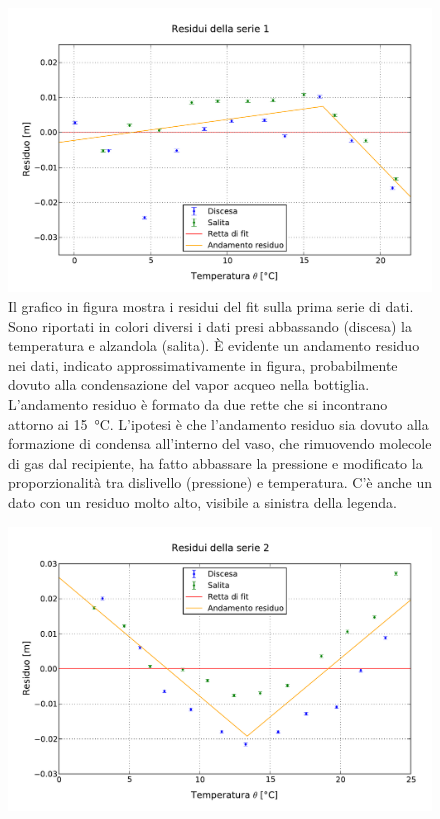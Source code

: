 \begin{figure}[p]
    \centering
    \includegraphics[width=130mm]{immagini/fit1.pdf}
    \caption{Il grafico in figura mostra i residui del fit sulla prima serie di dati. Sono riportati in colori
    diversi i dati presi abbassando (discesa) la temperatura e alzandola (salita). È evidente un andamento residuo nei dati,
    indicato approssimativamente in figura, probabilmente dovuto alla condensazione del vapor acqueo nella bottiglia. L'andamento
    residuo è formato da due rette che si incontrano attorno ai \SI{15}{\celsius}. L'ipotesi è che l'andamento residuo sia dovuto alla
    formazione di condensa all'interno del vaso, che rimuovendo molecole di gas dal recipiente, ha fatto abbassare la pressione e modificato
    la proporzionalità tra dislivello (pressione) e temperatura. C'è anche
    un dato con un residuo molto alto, visibile a sinistra della legenda.}
    \label{fig:fit1}
\end{figure}

\begin{figure}[p]
    \centering
    \includegraphics[width=130mm]{immagini/fit2.pdf}
    \caption{}
    \label{fig:fit2}
\end{figure}

